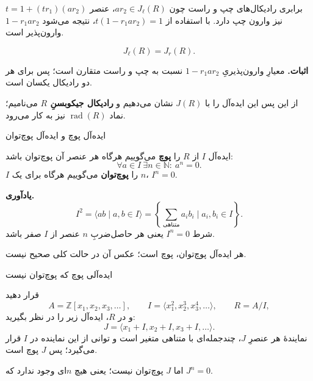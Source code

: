 \begin{frame}[t]{برابری رادیکال‌های چپ و راست}
\label{lec15:left-right-equality}
چون \(ar_2\in J_\ell(R)\)، عنصر \(t=1+(tr_1)(ar_2)\) نیز وارون چپ دارد.
با استفاده از \(t(1-r_1ar_2)=1\)، نتیجه می‌شود \(1-r_1ar_2\) وارون‌پذیر است.
\begin{corollary}
\[
 J_\ell(R)=J_r(R).
\]
\end{corollary}
\textbf{اثبات.} معیارِ وارون‌پذیریِ \(1-r_1ar_2\) نسبت به چپ و راست متقارن است؛ پس برای هر دو رادیکال یکسان است.
\medskip

از این پس این ایده‌آل را با \(J(R)\) نشان می‌دهیم و \textbf{رادیکال جیکوبسنِ \(R\)} می‌نامیم؛ نماد \(\operatorname{rad}(R)\) نیز به کار می‌رود.
\end{frame}

\begin{frame}[t]{ایده‌آل پوچ و ایده‌آل پوچ‌توان}
\label{lec15:nil-definitions}
\begin{definition}
ایده‌آل \(I\) از \(R\) را \textbf{پوچ} می‌گوییم هرگاه هر عنصر آن پوچ‌توان باشد:
\[
 \forall a\in I\ \exists n\in\mathbb N:\ a^n=0.
\]
\(I\) را \textbf{پوچ‌توان} می‌گوییم هرگاه برای یک \(n\)، \(I^n=0\).
\end{definition}
\textbf{یادآوری.}
\[
 I^2=\langle ab\mid a,b\in I\rangle
 =\left\{\sum_{\text{متناهی}}a_ib_i\mid a_i,b_i\in I\right\}.
\]
شرط \(I^n=0\) یعنی هر حاصل‌ضربِ \(n\) عنصر از \(I\) صفر باشد.
\begin{remark}
هر ایده‌آل پوچ‌توان، پوچ است؛ عکس آن در حالت کلی صحیح نیست.
\end{remark}
\end{frame}

\begin{frame}[t]{ایده‌آلی پوچ که پوچ‌توان نیست}
\label{lec15:nil-not-nilpotent}
\begin{example}
قرار دهید
\[
 A=\mathbb Z[x_1,x_2,x_3,\ldots],\qquad
 I=\langle x_1^2,x_2^3,x_3^4,\ldots\rangle,\qquad R=A/I,
\]
و در \(R\)، ایده‌آل زیر را در نظر بگیرید:
\[
 J=\langle x_1+I,x_2+I,x_3+I,\ldots\rangle.
\]
نمایندهٔ هر عنصرِ \(J\)، چندجمله‌ای با متناهی متغیر است و توانی از این نماینده در \(I\) قرار می‌گیرد؛ پس \(J\) پوچ است.
\medskip

اما \(J\) پوچ‌توان نیست؛ یعنی هیچ \(n\)ای وجود ندارد که \(J^n=0\).
\end{example}
\end{frame}

